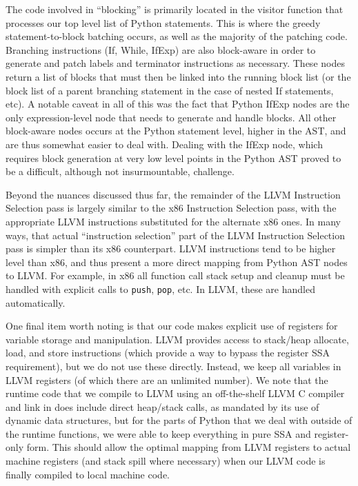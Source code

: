 \documentclass[11pt,twocolumn]{article}
\begin{document}
The code involved in ``blocking'' is primarily located in the visitor
function that processes our top level list of Python statements. This
is where the greedy statement-to-block batching occurs, as well as the
majority of the patching code. Branching instructions (If, While,
IfExp) are also block-aware in order to generate and patch labels and
terminator instructions as necessary. These nodes return a list of
blocks that must then be linked into the running block list (or the
block list of a parent branching statement in the case of nested If
statements, etc). A notable caveat in all of this was the fact that
Python IfExp nodes are the only expression-level node that needs to
generate and handle blocks. All other block-aware nodes occurs at the
Python statement level, higher in the AST, and are thus somewhat
easier to deal with. Dealing with the IfExp node, which requires block
generation at very low level points in the Python AST proved to be a
difficult, although not insurmountable, challenge.


Beyond the nuances discussed thus far, the remainder of the LLVM
Instruction Selection pass is largely similar to the x86 Instruction
Selection pass, with the appropriate LLVM instructions substituted for
the alternate x86 ones. In many ways, that actual ``instruction
selection'' part of the LLVM Instruction Selection pass is simpler
than its x86 counterpart. LLVM instructions tend to be higher level
than x86, and thus present a more direct mapping from Python AST nodes
to LLVM. For example, in x86 all function call stack setup and cleanup
must be handled with explicit calls to \texttt{push}, \texttt{pop},
etc. In LLVM, these are handled automatically.

One final item worth noting is that our code makes explicit use of
registers for variable storage and manipulation. LLVM provides access
to stack/heap allocate, load, and store instructions (which provide a
way to bypass the register SSA requirement), but we do not use these
directly. Instead, we keep all variables in LLVM registers (of which
there are an unlimited number). We note that the runtime code that we
compile to LLVM using an off-the-shelf LLVM C compiler and link in does
include direct heap/stack calls, as mandated by its use of dynamic
data structures, but for the parts of Python that we deal with outside
of the runtime functions, we were able to keep everything in pure SSA
and register-only form. This should allow the optimal mapping from
LLVM registers to actual machine registers (and stack spill where
necessary) when our LLVM code is finally compiled to local machine
code.
\end{document}
